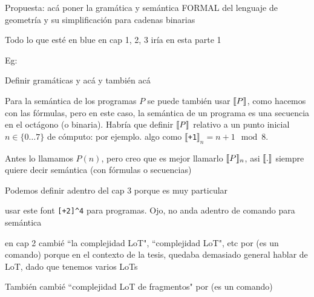 

    \color{blue}
    Propuesta: acá poner la gramática y semántica FORMAL del lenguaje de geometría y su simplificación para cadenas binarias

    Todo lo que esté en blue en cap 1, 2, 3 iría en esta parte 1

    Eg:

    Definir  gramáticas   \gramgeo y    \grambin acá y también \mdlbin acá

    Para la semántica de los programas $P$ se puede también usar $\llbracket P\rrbracket$, como hacemos con las fórmulas, pero en este caso, la semántica de un programa es una secuencia en el octágono (o binaria). Habría que definir $\llbracket P\rrbracket$ relativo a un punto inicial $n\in\{0\dots 7\}$ de cómputo: 
    por ejemplo. algo como $\llbracket$\verb#+1#$\rrbracket_n= n+1 \mod 8$.%

    Antes lo llamamos $P(n)$, pero creo que es mejor llamarlo $\llbracket P\rrbracket_n$, asi $\llbracket .\rrbracket$ siempre quiere decir semántica (con fórmulas o secuencias)

    Podemos definir \mdlbinfrag adentro del cap 3 porque es muy particular

    usar este font \verb#[+2]^4# para programas. Ojo, no anda adentro de comando para semántica

    en cap 2 cambié ``la complejidad LoT", ``complejidad LoT", etc por  \mdlbin (es un comando) porque en el contexto de la tesis, quedaba demasiado general hablar de LoT, dado que tenemos varios LoTs

    También cambié  ``complejidad LoT de fragmentos" por  \mdlbinfrag (es un comando)




